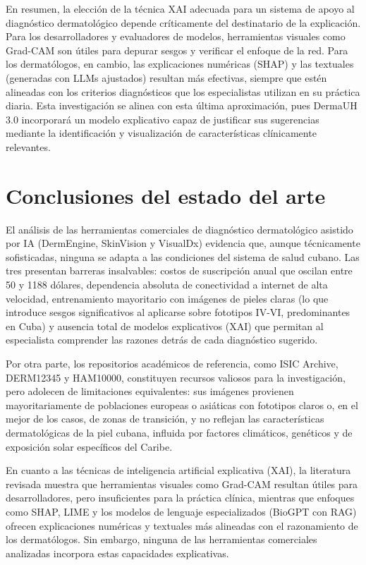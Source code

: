 En resumen, la elección de la técnica XAI adecuada para un sistema de apoyo al diagnóstico
dermatológico depende críticamente del destinatario de la explicación. Para los 
desarrolladores y evaluadores de modelos, herramientas visuales como Grad-CAM son útiles 
para depurar sesgos y verificar el enfoque de la red. Para los dermatólogos, en cambio, 
las explicaciones numéricas (SHAP) y las textuales (generadas con LLMs ajustados) resultan
más efectivas, siempre que estén alineadas con los criterios diagnósticos que los 
especialistas utilizan en su práctica diaria. Esta investigación se alinea con esta 
última aproximación, pues DermaUH 3.0 incorporará un modelo explicativo capaz de 
justificar sus sugerencias mediante la identificación y visualización de características 
clínicamente relevantes.

\section{Conclusiones del estado del arte}

El análisis de las herramientas comerciales de diagnóstico dermatológico asistido por IA 
(DermEngine, SkinVision y VisualDx) evidencia que, aunque técnicamente sofisticadas, 
ninguna se adapta a las condiciones del sistema de salud cubano. Las tres presentan 
barreras insalvables: costos de suscripción anual que oscilan entre 50 y 1188 dólares, 
dependencia absoluta de conectividad a internet de alta velocidad, entrenamiento 
mayoritario con imágenes de pieles claras (lo que introduce sesgos significativos al 
aplicarse sobre fototipos IV-VI, predominantes en Cuba) y ausencia total de modelos 
explicativos (XAI) que permitan al especialista comprender las razones detrás de cada 
diagnóstico sugerido.

Por otra parte, los repositorios académicos de referencia, como ISIC Archive, DERM12345 y 
HAM10000, constituyen recursos valiosos para la investigación, pero adolecen de 
limitaciones equivalentes: sus imágenes provienen mayoritariamente de poblaciones europeas 
o asiáticas con fototipos claros o, en el mejor de los casos, de zonas de transición, y 
no reflejan las características dermatológicas de la piel cubana, influida por factores 
climáticos, genéticos y de exposición solar específicos del Caribe.

En cuanto a las técnicas de inteligencia artificial explicativa (XAI), la literatura 
revisada muestra que herramientas visuales como Grad-CAM resultan útiles para desarrolladores, 
pero insuficientes para la práctica clínica, mientras que enfoques como SHAP, LIME y los 
modelos de lenguaje especializados (BioGPT con RAG) ofrecen explicaciones numéricas y 
textuales más alineadas con el razonamiento de los dermatólogos. Sin embargo, ninguna de 
las herramientas comerciales analizadas incorpora estas capacidades explicativas.

